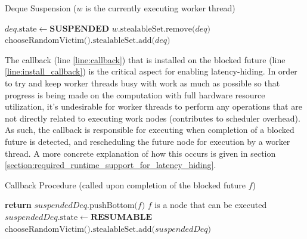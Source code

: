 \documentclass[bsc,frontabs,singlespacing,parskip,deptreport,normalheadings]{infthesis}
\begin{document}
\begin{algorithm}
\caption{Deque Suspension ($w$ is the currently executing worker thread)}
\label{alg:suspend_and_find}
\begin{algorithmic}[1]
     \label{line:deque_suspension}
        \State $deq\text{.state} \gets \textbf{SUSPENDED}$
        \State $ w \text{.stealableSet.remove(} deq \text{)}$
            \State $ \text{chooseRandomVictim().stealableSet.add(} deq \text{)}$
        \EndIf
    \EndFunction
\end{algorithmic}
\end{algorithm}

The callback (line \ref{line:callback}) that is installed on the blocked future
(line \ref{line:install_callback}) is the critical aspect for enabling
latency-hiding. In order to try and keep worker threads busy with work as much
as possible so that progress is being made on the computation with full hardware
resource utilization, it's undesirable for worker threads to perform any
operations that are not directly related to executing work nodes (contributes to
scheduler overhead). As such, the callback is responsible for executing when
completion of a blocked future is detected, and rescheduling the future node for
execution by a worker thread. A more concrete explanation of how this occurs is
given in section \ref{section:required_runtime_support_for_latency_hiding}.

\begin{algorithm}
\caption{Callback Procedure (called upon completion of the blocked future $f$)}
\label{alg:callback}
\begin{algorithmic}[1]
     \label{line:callback}
            \label{line:sus_check}
            \State \textbf{return}
        \EndIf
        \State $suspendedDeq \text{.pushBottom(} f \text{)}$ \Comment $f$ is a node
            that can be executed
        \State $suspendedDeq\text{.state} \gets \textbf{RESUMABLE}$
            \State $\text{chooseRandomVictim().stealableSet.add(} suspendedDeq
                \text{)}$
        \EndIf
    \EndFunction
\end{algorithmic}
\end{algorithm}
\end{document}
